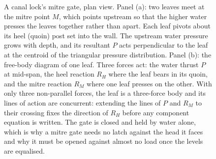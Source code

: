 \begin{figure}[htbp]
\caption[A mitre lock gate as a three-force body]{A canal lock's mitre gate,
plan view. Panel (a): two leaves meet at the mitre point $M$, which points
upstream so that the higher water presses the leaves together rather than
apart. Each leaf pivots about its heel (quoin) post set into the wall. The
upstream water pressure grows with depth, and its resultant $P$ acts
perpendicular to the leaf at the centroid of the triangular pressure
distribution. Panel (b): the free-body diagram of one leaf. Three forces act:
the water thrust $P$ at mid-span, the heel reaction $R_H$ where the leaf bears
in its quoin, and the mitre reaction $R_M$ where one leaf presses on the
other. With only three non-parallel forces, the leaf is a three-force body and
its lines of action are concurrent: extending the lines of $P$ and $R_M$ to
their crossing fixes the direction of $R_H$ before any component equation is
written. The gate is closed and held by water alone, which is why a mitre gate
needs no latch against the head it faces and why it must be opened against
almost no load once the levels are equalised.}
\label{fig:vol03ch01:lock-gate}
\end{figure}
